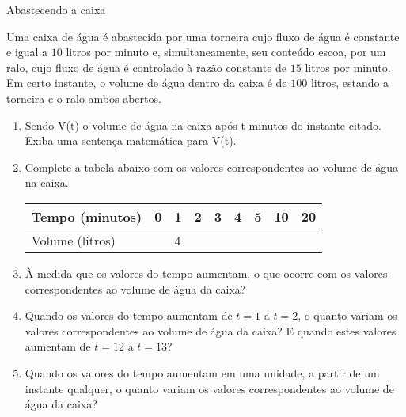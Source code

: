 \begin{task}{Abastecendo a caixa}
\label{\detokenize{AF107-6:atividade-abastecendo-a-caixa}}\label{\detokenize{AF107-6:id1}}


Uma caixa de água é abastecida por uma torneira cujo fluxo de água é constante e igual a \(10\) litros por minuto e, simultaneamente, seu conteúdo escoa, por um ralo, cujo fluxo de água é controlado à razão constante de \(15\) litros por minuto. Em certo instante, o volume de água dentro da caixa é de \(100\) litros, estando a torneira e o ralo ambos abertos.
\begin{enumerate}
\item {} 
Sendo V(t) o volume de água na caixa após t minutos do instante citado. Exiba uma sentença matemática para V(t).

\item {} 
Complete a tabela abaixo com os valores correspondentes ao volume de água na caixa.


\begin{savenotes}\sphinxattablestart
\centering
\begin{tabulary}{\linewidth}[t]{|T|T|T|T|T|T|T|T|T|}
\hline

Tempo (minutos)
&
0
&
1
&
2
&
3
&
4
&
5
&
10
&
20
\\
\hline
Volume (litros)
&&
4
&&&&&&\\
\hline
\end{tabulary}
\par
\sphinxattableend\end{savenotes}

\item {} 
À medida que os valores do tempo aumentam, o que ocorre com os valores correspondentes ao volume de água da caixa?

\item {} 
Quando os valores do tempo aumentam de \(t=1\) a \(t=2\), o quanto variam os valores correspondentes ao volume de água da caixa? E quando estes valores aumentam de \(t=12\) a \(t=13\)?

\item {} 
Quando os valores do tempo aumentam em uma unidade, a partir de um instante qualquer, o quanto variam os valores correspondentes ao volume de água da caixa?

\end{enumerate}

\end{task}


